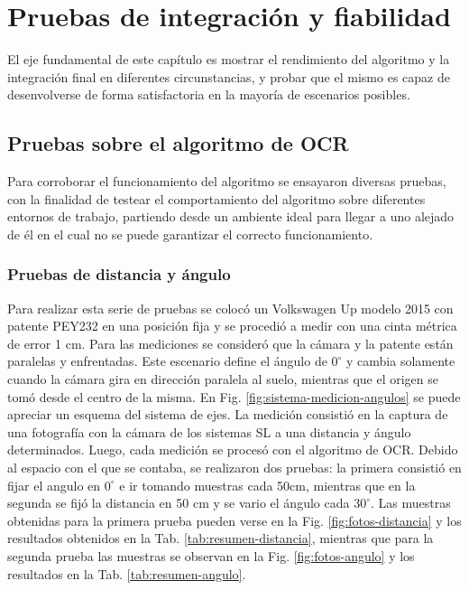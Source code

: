 \chapter{Pruebas de integración y fiabilidad}

El eje fundamental de este capítulo es mostrar el rendimiento del algoritmo y la integración final en diferentes circunstancias, y probar que el mismo es capaz de desenvolverse de forma satisfactoria en la mayoría de escenarios posibles.

\section{Pruebas sobre el algoritmo de OCR}
Para corroborar el funcionamiento del algoritmo se ensayaron diversas pruebas, con la finalidad de testear el comportamiento del algoritmo sobre diferentes entornos de trabajo, partiendo desde un ambiente ideal para llegar a uno alejado de él en el cual no se puede garantizar el correcto funcionamiento.

\subsection{Pruebas de distancia y ángulo}
Para realizar esta serie de pruebas se colocó un Volkswagen Up modelo 2015 con patente PEY232 en una posición fija y se procedió a medir con una cinta métrica de error 1 cm. Para las mediciones se consideró que la cámara y la patente están paralelas y enfrentadas. Este escenario define el ángulo de $0^\circ$ y cambia solamente cuando la cámara gira en dirección paralela al suelo, mientras que el origen se tomó desde el centro de la misma.
En Fig. \ref{fig:sistema-medicion-angulos} se puede apreciar un esquema del sistema de ejes. La medición consistió en la captura de una fotografía con la cámara de los sistemas SL a una distancia y ángulo determinados. Luego, cada medición se procesó con el algoritmo de OCR.
Debido al espacio con el que se contaba, se realizaron dos pruebas: la primera consistió en fijar el angulo en $0^\circ$ e ir tomando muestras cada 50cm, mientras que en la segunda se fijó la distancia en 50 cm y se vario el ángulo cada $30^\circ$.
Las muestras obtenidas para la primera prueba pueden verse en la Fig. \ref{fig:fotos-distancia} y los resultados obtenidos en la Tab. \ref{tab:resumen-distancia}, mientras que para la segunda prueba las muestras se observan en la Fig. \ref{fig:fotos-angulo} y los resultados en la Tab. \ref{tab:resumen-angulo}.


